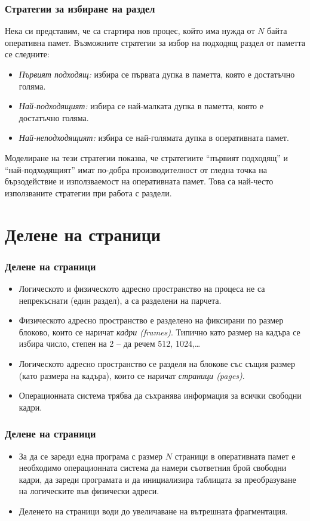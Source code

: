 \documentclass[ignorenonframetext, hyperref=unicode]{beamer}
\begin{document}
\begin{frame}
\frametitle{Стратегии за избиране на раздел}
Нека си представим, че са стартира нов процес, който има нужда от $N$
байта оперативна памет. Възможните стратегии за избор на подходящ раздел от
паметта се следните:
\begin{itemize}
  \item {\em Първият подходящ:} избира се първата дупка в паметта, която е
  достатъчно голяма.
  \item {\em Най-подходящият:} избира се най-малката дупка в паметта, която е
  достатъчно голяма. 
  \item {\em Най-неподходящият:} избира се най-голямата дупка в оперативната
  памет.
\end{itemize}
Моделиране на тези стратегии показва, че стратегиите ``първият подходящ'' и
``най-подходящият'' имат по-добра производителност от гледна точка на
бързодействие и използваемост на оперативната памет. Това са най-често
използваните стратегии при работа с раздели.
\end{frame}


\section{Делене на страници}
\begin{frame}
\frametitle{Делене на страници}
\begin{itemize}
  \item Логическото и физическото адресно пространство на процеса не са
  непрекъснати (един раздел), а са разделени на парчета.
  \item Физическото адресно пространство е разделено на фиксирани по размер
  блоково, които се наричат {\em кадри (frames)}. Типично като размер на кадъра
  се избира число, степен на 2 -- да речем 512, 1024,\ldots
  \item Логическото адресно пространство се разделя на блокове със същия размер
  (като размера на кадъра), които се наричат {\em страници (pages)}.
  \item Операционната система трябва да съхранява информация за всички свободни
  кадри.
\end{itemize}
\end{frame}

\begin{frame}
\frametitle{Делене на страници}
\begin{itemize}
  \item За да се зареди една програма с размер $N$ страници в оперативната
  памет е необходимо операционната система да намери съответния брой свободни
  кадри, да зареди програмата и да инициализира таблицата за преобразуване на
  логическите във физически адреси.
  \item Деленето на страници води до увеличаване на вътрешната фрагментация.
\end{itemize}
\end{frame}
\end{document}
